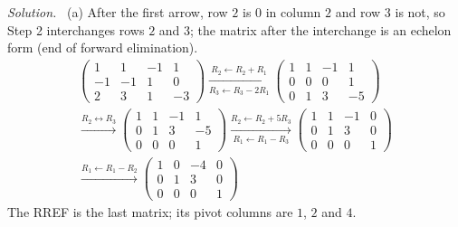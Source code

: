 \documentclass[12pt]{article}
\theoremstyle{definition}
\newenvironment{solution}{\par\noindent\textit{Solution.}\ }{\par\smallskip}
\begin{document}
\begin{solution}
(a) After the first arrow, row \(2\) is \(0\) in column \(2\) and row \(3\) is not, so Step 2 interchanges rows
\(2\) and \(3\); the matrix after the interchange is an echelon form (end of forward elimination).
\[
\begin{gathered}
\begin{pmatrix}1&1&-1&1\\-1&-1&1&0\\2&3&1&-3\end{pmatrix}
\xrightarrow[R_3\leftarrow R_3-2R_1]{R_2\leftarrow R_2+R_1}
\begin{pmatrix}1&1&-1&1\\0&0&0&1\\0&1&3&-5\end{pmatrix}
\\
\xrightarrow{R_2\leftrightarrow R_3}
\begin{pmatrix}1&1&-1&1\\0&1&3&-5\\0&0&0&1\end{pmatrix}
\xrightarrow[R_1\leftarrow R_1-R_3]{R_2\leftarrow R_2+5R_3}
\begin{pmatrix}1&1&-1&0\\0&1&3&0\\0&0&0&1\end{pmatrix}
\\
\xrightarrow{R_1\leftarrow R_1-R_2}
\begin{pmatrix}1&0&-4&0\\0&1&3&0\\0&0&0&1\end{pmatrix}
\end{gathered}
\]
The RREF is the last matrix; its pivot columns are \(1\), \(2\) and \(4\).


\end{solution}
\end{document}
